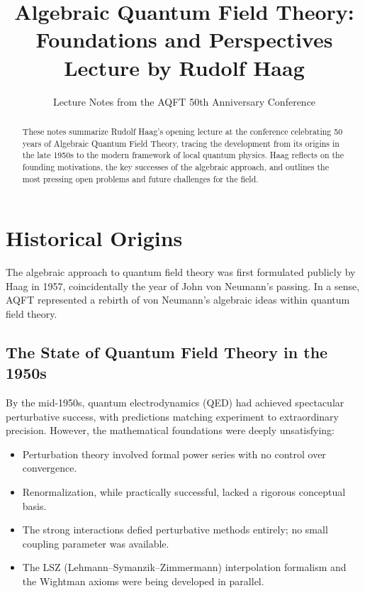 \documentclass[11pt,a4paper]{article}
\title{\textbf{Algebraic Quantum Field Theory:\\Foundations and Perspectives}\\[6pt]
\large Lecture by Rudolf Haag}
\author{Lecture Notes from the AQFT 50th Anniversary Conference}
\date{}
\begin{document}
\maketitle

\begin{abstract}
These notes summarize Rudolf Haag's opening lecture at the conference celebrating
50 years of Algebraic Quantum Field Theory, tracing the development from its origins
in the late 1950s to the modern framework of local quantum physics. Haag reflects on
the founding motivations, the key successes of the algebraic approach, and outlines
the most pressing open problems and future challenges for the field.
\end{abstract}

\tableofcontents

\section{Historical Origins}

The algebraic approach to quantum field theory was first formulated publicly
by Haag in 1957, coincidentally the year of John von Neumann's passing.
In a sense, AQFT represented a rebirth of von Neumann's algebraic ideas
within quantum field theory.

\subsection{The State of Quantum Field Theory in the 1950s}

By the mid-1950s, quantum electrodynamics (QED) had achieved spectacular
perturbative success, with predictions matching experiment to extraordinary
precision. However, the mathematical foundations were deeply unsatisfying:
\begin{itemize}[nosep]
  \item Perturbation theory involved formal power series with no control over convergence.
  \item Renormalization, while practically successful, lacked a rigorous conceptual basis.
  \item The strong interactions defied perturbative methods entirely; no small coupling
        parameter was available.
  \item The LSZ (Lehmann--Symanzik--Zimmermann) interpolation formalism and the
        Wightman axioms were being developed in parallel.
\end{itemize}
\end{document}

